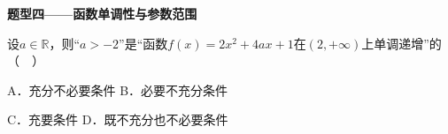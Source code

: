 \documentclass[12pt,a4paper]{article}
\newcommand{\qtitle}[1]{{\Large\bfseries\color[HTML]{1F3864}#1}\par\vspace{0.9em}}
\begin{document}
\qtitle{题型四——函数单调性与参数范围}

设$a\in\mathbb{R}$，则“$a>-2$”是“函数$f(x)=2x^2+4ax+1$在$(2,+\infty)$上单调递增”的（　）\par
\vspace{0.9em}
A．充分不必要条件 \qquad\qquad B．必要不充分条件\par
\vspace{0.45em}
C．充要条件 \qquad\qquad D．既不充分也不必要条件\par
\vspace{0.45em}
\end{document}

